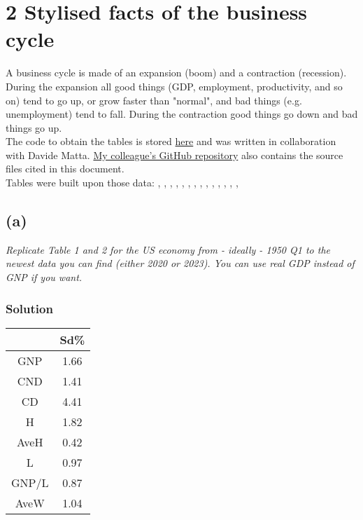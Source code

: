 \documentclass[a4paper,10pt]{report}
\begin{document}
\chapter*{2 Stylised facts of the business cycle}
A business cycle is made of an expansion (boom) and a contraction (recession). During the
expansion all good things (GDP, employment, productivity, and so on) tend to go up, or
grow faster than "normal", and bad things (e.g. unemployment) tend to fall. During the
contraction good things go down and bad things go up.\\
The code to obtain the tables is stored \href{https://github.com/LeonardoAcquaroli/dem_assignements/blob/main/nbps1.ipynb}{here} and was written in collaboration with Davide Matta. \href{https://github.com/DavideMatta/DynamicEconomicModeling/tree/main}{My colleague's GitHub repository} also contains the source files cited in this document.\\
Tables were built upon those data:
\cite{averagewage}, \cite{averagehours}, \cite{cpi}, \cite{gdp}, \cite{gnp}, \cite{hoursworked}, \cite{durableconsumption}, \cite{nondurableconsumption}, \cite{laborproductivity}, \cite{employment}, \cite{consumptionpercapita}, \cite{grossinvestment}, \cite{population}, \cite{productivity}, \cite{discountrate}


\section*{(a)}
\textit{Replicate Table 1 and 2 for the US economy from - ideally - 1950 Q1 to the newest data you can find (either 2020 or 2023). You can use real GDP instead of GNP if you want.}
\subsection*{Solution}

\begin{tabular}{cc}
\centering
\textbf{} & \textbf{Sd\%} \\
\hline
GNP & 1.66 \\
CND & 1.41 \\
CD & 4.41 \\
H & 1.82 \\
AveH & 0.42 \\
L & 0.97 \\
GNP/L & 0.87 \\
AveW & 1.04 \\
\end{tabular}
\end{document}
